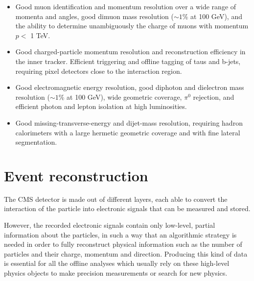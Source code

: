 \documentclass[a4paper, 10pt, openright]{report}
\begin{document}
\begin{itemize}
\item Good muon identification and momentum resolution over a wide range of momenta and angles, good dimuon mass resolution ($\sim 1$\% at 100 GeV), and the ability to determine unambiguously the charge of muons with momentum $p <$ 1 TeV.
\item Good charged-particle momentum resolution and reconstruction efficiency in the inner tracker. Efficient triggering and offline tagging of taus and b-jets, requiring pixel detectors close to the interaction region.
\item Good electromagnetic energy resolution, good diphoton and dielectron mass resolution ($\sim 1$\% at 100 GeV), wide geometric coverage, $\pi^0$ rejection, and efficient photon and lepton isolation at high luminosities.
\item Good missing-transverse-energy and dijet-mass resolution, requiring hadron calorimeters with a large hermetic geometric coverage and with fine lateral segmentation.
\end{itemize}




























\chapter{Event reconstruction} \label{chapter:Reco}

The \ac{CMS} detector is made out of different layers, each able to convert the interaction of the particle into electronic signals that can be measured and stored. 

However, the recorded electronic signals contain only low-level, partial information about the particles, in such a way that an algorithmic strategy is needed in order to fully reconstruct physical information such as the number of particles and their charge, momentum and direction. Producing this kind of data is essential for all the offline analyses which usually rely on these high-level physics objects to make precision measurements or search for new physics. 
\end{document}
